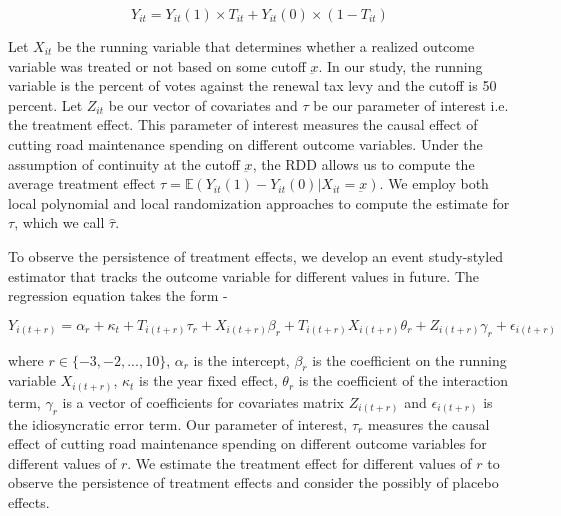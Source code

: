 $$
Y_{it} = Y_{it}(1) \times T_{it} + Y_{it}(0) \times (1-T_{it})
$$

Let $X_{it}$ be the running variable that determines whether a realized outcome variable was treated or not based on some cutoff $\underbar{x}$. In our study, the running variable is the percent of votes against the renewal tax levy and the cutoff is 50 percent. Let $Z_{it}$ be our vector of covariates and $\tau$ be our parameter of interest i.e. the treatment effect. This parameter of interest measures the causal effect of cutting road maintenance spending on different outcome variables. Under the assumption of continuity at the cutoff $\underbar{x}$, the RDD allows us to compute the average treatment effect $\tau = \mathbb{E}(Y_{it}(1) - Y_{it}(0) | X_{it} = \underbar{x})$. We employ both local polynomial and local randomization approaches to compute the estimate for $\tau$, which we call $\hat{\tau}$.

To observe the persistence of treatment effects, we develop an event study-styled estimator that tracks the outcome variable for different values in future. The regression equation takes the form -

$$
Y_{i(t+r)} = \alpha_r + \kappa_t + T_{i(t+r)} \tau_r + X_{i(t+r)} \beta_r + T_{i(t+r)} X_{i(t+r)} \theta_r + Z_{i(t+r)} \gamma_r + \epsilon_{i(t+r)}
$$

\noindent where $r \in \{-3,-2, ..., 10 \}$, $\alpha_r$ is the intercept, $\beta_r$ is the coefficient on the running variable $X_{i(t+r)}$, $\kappa_t$ is the year fixed effect, $\theta_r$ is the coefficient of the interaction term, $\gamma_r$ is a vector of coefficients for covariates matrix $Z_{i(t+r)}$ and $\epsilon_{i(t+r)}$ is the idiosyncratic error term. Our parameter of interest, $\tau_r$ measures the causal effect of cutting road maintenance spending on different outcome variables for different values of $r$. We estimate the treatment effect for different values of $r$ to observe the persistence of treatment effects and consider the possibly of placebo effects. 


